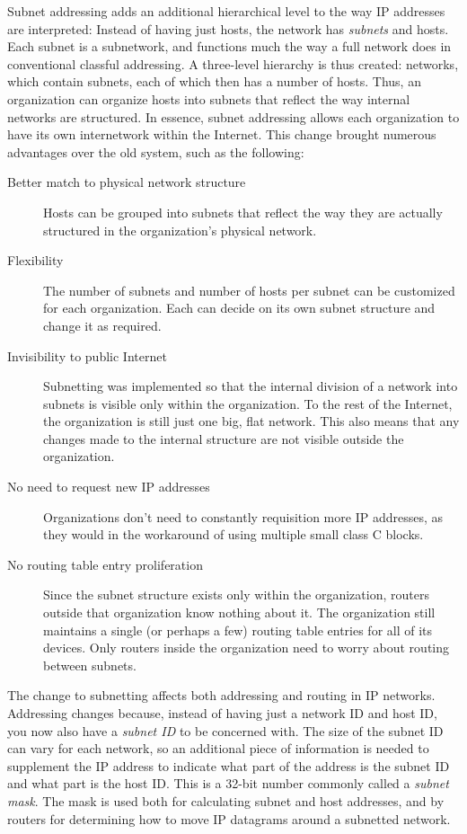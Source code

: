 Subnet addressing adds an additional hierarchical level to the way IP
addresses are interpreted: Instead of having just hosts, the network has
{\emph{subnets}} and hosts. Each subnet is a subnetwork, and functions
much the way a full network does in conventional classful addressing. A
three-level hierarchy is thus created: networks, which contain subnets,
each of which then has a number of hosts. Thus, an organization can
organize hosts into subnets that reflect the way internal networks are
structured. In essence, subnet addressing allows each organization to
have its own internetwork within the Internet. This change brought
numerous advantages over the old system, such as the following:
\begin{description}
   \item[Better match to physical network structure]
      Hosts can be grouped into subnets that reflect the way they are actually structured in the organization's physical network.

   \item[Flexibility]
      The number of subnets and number of hosts per subnet can be customized for each organization.
      Each can decide on its own subnet structure and change it as required.

   \item[Invisibility to public Internet]
      Subnetting was implemented so that the internal division of a network into subnets is visible only within the organization.
      To the rest of the Internet, the organization is still just one big, flat network.
      This also means that any changes made to the internal structure are not visible outside the organization.

   \item[No need to request new IP addresses]
      Organizations don't need to constantly requisition more IP addresses, as they would in the workaround of using multiple small class C blocks.

   \item[No routing table entry proliferation]
      Since the subnet structure exists only within the organization, routers outside that organization know nothing about it.
      The organization still maintains a single (or perhaps a few) routing table entries for all of its devices.
      Only routers inside the organization need to worry about routing between subnets.
\end{description}


The change to subnetting affects both addressing and routing in IP
networks. Addressing changes because, instead of having just a network
ID and host ID, you now also have a {\emph{subnet ID}} to be concerned
with. The size of the subnet ID can vary for each network, so an
additional piece of information is needed to supplement the IP address
to indicate what part of the address is the subnet ID and what part is
the host ID. This is a 32-bit number commonly called a {\emph{subnet
mask}}. The mask is used both for calculating subnet and host addresses,
and by routers for determining how to move IP datagrams around a
subnetted network.

